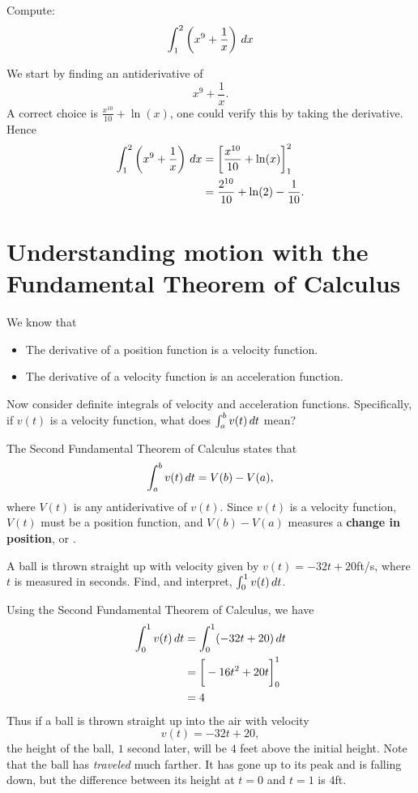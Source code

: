 \documentclass{ximera}
\begin{document}
\begin{example}
Compute:
\[
\int_1^2\left(x^9 + \frac{1}{x}\right) \,d x
\]
\begin{explanation}
We start by finding an antiderivative of
\[
x^9 + \frac{1}{x}.
\]
A correct choice is $\frac{x^{10}}{10} + \ln(x)$, one could verify
this by taking the derivative. Hence
\begin{align*}
\int_1^2\left(x^9 + \frac{1}{x}\right) \,d x &= \bigg[ \frac{x^{10}}{10} + \ln(x) \bigg]_1^2 \\
&= \frac{2^{10}}{10} + \ln(2) - \frac{1}{10}.
\end{align*}
\end{explanation}
\end{example}




\section{Understanding motion with the Fundamental Theorem of Calculus}

We know that
\begin{itemize}
\item The derivative of a position function is a velocity function.
\item The derivative of a velocity function is an acceleration
  function.
\end{itemize}
Now consider definite integrals of velocity and acceleration
functions. Specifically, if $v(t)$ is a velocity function, what does
$\int_a^b v(t)\,d t$ mean?

The Second Fundamental Theorem of Calculus states that
\[
\int_a^b v(t)\,d t = V(b) - V(a),
\]
where $V(t)$ is any antiderivative of $v(t)$. Since $v(t)$ is a
velocity function, $V(t)$ must be a position function, and $V(b) -
V(a)$ measures a \textbf{change in position}, or .

\begin{example}
  A ball is thrown straight up with velocity given by $v(t) =
  -32t+20$ft/s, where $t$ is measured in seconds. Find, and interpret,
  $\int_0^1 v(t)\,d t$.
    \begin{explanation}
      Using the Second Fundamental Theorem of Calculus, we have
      \begin{align*}
        \int_0^1 v(t)\,d t &= \int_0^1 (-32t+20)\,d t \\
	&= \bigg[ -16t^2 + 20t \bigg]_0^1 \\
	&= 4
      \end{align*}
      Thus if a ball is thrown straight up into the air with velocity
      \[
      v(t) = -32t+20,
      \]
      the height of the ball, $1$ second later, will be $4$ feet above the
      initial height. Note that the ball has \textit{traveled} much
      farther. It has gone up to its peak and is falling down, but the
      difference between its height at $t=0$ and $t=1$ is $4$ft. 
    \end{explanation}
\end{example}    
\end{document}
